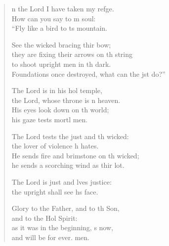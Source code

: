 \begin{verse}
  \begin{patverse}
n the Lord I have taken my refge.\Flex\\
How can you say to m soul:\Med\\
“Fly like a bird to \pointup{\i}ts mountain.

See the wicked bracing thir bow;\Med\\
they are fixing their arrows on th string\\
to shoot upright men in th dark.\Med\\
Foundations once destroyed, what can the jst do?”

The Lord is in his hol temple,\Med\\
the Lord, whose throne is \pointup{\i}n heaven.\\
His eyes look down on th world;\Med\\
his gaze tests mortl men.

The Lord tests the just and th wicked:\Med\\
the lover of violence h hates.\\
He sends fire and brimstone on th wicked;\Med\\
he sends a scorching wind as thir lot.

The Lord is just and lves justice:\Med\\
the upright shall see h\pointup{\i}s face.

Glory to the Father, and to th Son,\Med\\
and to the Hol Spirit:\\
as it was in the beginning, \pointup{\i}s now,\Med\\
and will be for ever. men.
  \end{patverse}
\end{verse}
